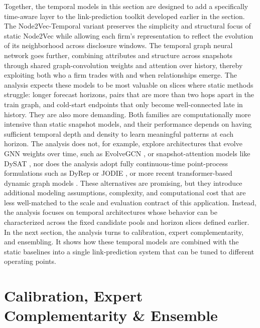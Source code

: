 Together, the temporal models in this section are designed to add a specifically time-aware layer to the link-prediction toolkit developed earlier in the section. The Node2Vec-Temporal variant preserves the simplicity and structural focus of static Node2Vec while allowing each firm's representation to reflect the evolution of its neighborhood across disclosure windows. The temporal graph neural network goes further, combining attributes and structure across snapshots through shared graph-convolution weights and attention over history, thereby exploiting both who a firm trades with and when relationships emerge. The analysis expects these models to be most valuable on slices where static methods struggle: longer forecast horizons, pairs that are more than two hops apart in the train graph, and cold-start endpoints that only become well-connected late in history. They are also more demanding. Both families are computationally more intensive than static snapshot models, and their performance depends on having sufficient temporal depth and density to learn meaningful patterns at each horizon. The analysis does not, for example, explore architectures that evolve GNN weights over time, such as EvolveGCN \parencite{pareja_evolvegcn_2020}, or snapshot-attention models like DySAT \parencite{sankar_dysat_2020}, nor does the analysis adopt fully continuous-time point-process formulations such as DyRep or JODIE \parencite{trivedi_know-evolve_2017,kumar_predicting_2019}, or more recent transformer-based dynamic graph models \parencite{yu_towards_2023}. These alternatives are promising, but they introduce additional modeling assumptions, complexity, and computational cost that are less well-matched to the scale and evaluation contract of this application. Instead, the analysis focuses on temporal architectures whose behavior can be characterized across the fixed candidate pools and horizon slices defined earlier. In the next section, the analysis turns to calibration, expert complementarity, and ensembling. It shows how these temporal models are combined with the static baselines into a single link-prediction system that can be tuned to different operating points.

\section{Calibration, Expert Complementarity \& Ensemble}

